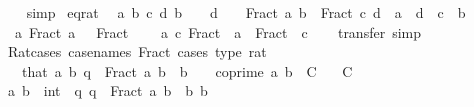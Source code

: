 \begin{isabellebody}
\ \ %
\endisadelimproof
%
\isatagproof
{}\isamarkupfalse%
\ simp%
\endisatagproof
{\isafoldproof}%
%
\isadelimproof
\isanewline
%
\endisadelimproof
\isanewline
{}\isamarkupfalse%
\ eq{\isacharunderscore}{\kern0pt}rat{\isacharcolon}{\kern0pt}\isanewline
\ \ {\isachardoublequoteopen}{\isasymAnd}a\ b\ c\ d{\isachardot}{\kern0pt}\ b\ {\isasymnoteq}\ {}\ {\isasymLongrightarrow}\ d\ {\isasymnoteq}\ {}\ {\isasymLongrightarrow}\ Fract\ a\ b\ {\isacharequal}{\kern0pt}\ Fract\ c\ d\ {\isasymlongleftrightarrow}\ a\ {\isacharasterisk}{\kern0pt}\ d\ {\isacharequal}{\kern0pt}\ c\ {\isacharasterisk}{\kern0pt}\ b{\isachardoublequoteclose}\isanewline
\ \ {\isachardoublequoteopen}{\isasymAnd}a{\isachardot}{\kern0pt}\ Fract\ a\ {}\ {\isacharequal}{\kern0pt}\ Fract\ {}\ {}{\isachardoublequoteclose}\isanewline
\ \ {\isachardoublequoteopen}{\isasymAnd}a\ c{\isachardot}{\kern0pt}\ Fract\ {}\ a\ {\isacharequal}{\kern0pt}\ Fract\ {}\ c{\isachardoublequoteclose}\isanewline
%
\isadelimproof
\ \ %
\endisadelimproof
%
\isatagproof
{}\isamarkupfalse%
\ {\isacharparenleft}{\kern0pt}transfer{\isacharcomma}{\kern0pt}\ simp{\isacharparenright}{\kern0pt}{\isacharplus}{\kern0pt}%
\endisatagproof
{\isafoldproof}%
%
\isadelimproof
\isanewline
%
\endisadelimproof
\isanewline
{}\isamarkupfalse%
\ Rat{\isacharunderscore}{\kern0pt}cases\ {\isacharbrackleft}{\kern0pt}case{\isacharunderscore}{\kern0pt}names\ Fract{\isacharcomma}{\kern0pt}\ cases\ type{\isacharcolon}{\kern0pt}\ rat{\isacharbrackright}{\kern0pt}{\isacharcolon}{\kern0pt}\isanewline
\ \ \ that{\isacharcolon}{\kern0pt}\ {\isachardoublequoteopen}{\isasymAnd}a\ b{\isachardot}{\kern0pt}\ q\ {\isacharequal}{\kern0pt}\ Fract\ a\ b\ {\isasymLongrightarrow}\ b\ {\isachargreater}{\kern0pt}\ {}\ {\isasymLongrightarrow}\ coprime\ a\ b\ {\isasymLongrightarrow}\ C{\isachardoublequoteclose}\isanewline
\ \ \ C\isanewline
%
\isadelimproof
%
\endisadelimproof
%
\isatagproof
{}\isamarkupfalse%
\ {\isacharminus}{\kern0pt}\isanewline
\ \ \isamarkupfalse%
\ a\ b\ {\isacharcolon}{\kern0pt}{\isacharcolon}{\kern0pt}\ int\ \ q{\isacharcolon}{\kern0pt}\ {\isachardoublequoteopen}q\ {\isacharequal}{\kern0pt}\ Fract\ a\ b{\isachardoublequoteclose}\ \ b{\isacharcolon}{\kern0pt}\ {\isachardoublequoteopen}b\ {\isasymnoteq}\ {}{\isachardoublequoteclose}\isanewline
\ \ \ \ \isamarkupfalse%

\end{isabellebody}
